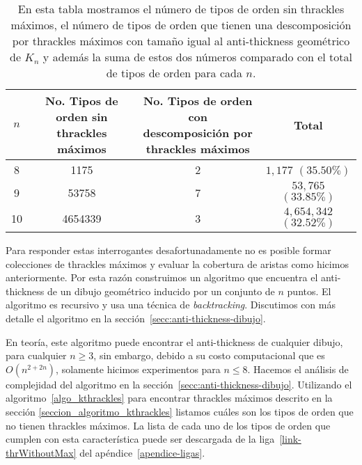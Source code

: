   \begin{table}
    \centering
    \begin{tabular}{|c|c|c|c|}
      \hline
      $n$     & \makecell{No. Tipos de orden sin\\ thrackles máximos} & \makecell{No. Tipos de orden con\\
      descomposición por \\ thrackles máximos} & Total \\ \hline
      8       &  1175     & 2 & $1,177$ $(35.50\%)$   \\ \hline
      9       &  53758    & 7 & \makecell{$53,765$\\$(33.85\%)$}  \\ \hline
      10      &  4654339  & 3 & \makecell{$4,654,342 $\\$(32.52\%)$}  \\ \hline
    \end{tabular}
    \caption{En esta tabla mostramos el número de tipos de orden sin thrackles máximos, el número
    de tipos de orden que tienen una descomposición por thrackles máximos con tamaño igual al
    anti-thickness geométrico de $K_n$ y además la suma de estos dos números comparado con el total
    de tipos de  orden para cada $n$.}
    \label{tabla_totales}
  \end{table}

  Para responder estas interrogantes desafortunadamente no es posible formar colecciones de
  thrackles máximos y evaluar la cobertura de aristas como hicimos anteriormente. Por esta razón
  construimos un algoritmo que encuentra el anti-thickness de un dibujo geométrico inducido por un
  conjunto de $n$ puntos. El algoritmo es recursivo y usa una técnica de \emph{backtracking}.
  Discutimos con más detalle el algoritmo en la sección~\ref{secc:anti-thickness-dibujo}.

  En teoría, este algoritmo puede encontrar el anti-thickness de cualquier dibujo, para cualquier
  $n \geq 3$, sin embargo, debido a su costo computacional que es $O(n^{2+2n})$, solamente hicimos
  experimentos para $n\leq 8$. Hacemos el análisis de complejidad del algoritmo en la
  sección~\ref{secc:anti-thickness-dibujo}. Utilizando el algoritmo~\ref{algo_kthrackles} para
  encontrar thrackles máximos descrito en la sección \ref{seccion_algoritmo_kthrackles} listamos
  cuáles son los tipos de orden que no tienen thrackles máximos. La lista de cada uno de los tipos
  de orden que cumplen con esta característica puede ser descargada de la
  liga~\ref{link-thrWithoutMax} del apéndice~\ref{apendice-ligas}.

